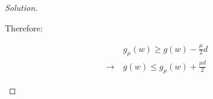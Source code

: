 \documentclass{article}
\newenvironment{solution}
  {\renewcommand\qedsymbol{$\blacksquare$}\begin{proof}[Solution]}
  {\end{proof}}
\begin{document}
\begin{solution}
\begin{itemize}
        Therefore:

        \begin{align*}
            & g_\mu(w) \geq g(w) - \frac{\mu}{2} d \\
            \rightarrow \ & g(w) \leq g_\mu(w) + \frac{\mu d}{2}
        \end{align*}
    \end{itemize}
\end{solution}
\end{document}
